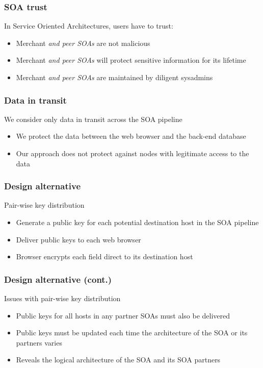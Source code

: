 \documentclass{beamer}
\begin{document}
\begin{frame}
\frametitle{SOA trust}
In Service Oriented Architectures, users have to trust:
\smallskip
\begin{itemize}
\item Merchant \emph{and peer SOAs} are not malicious
\item Merchant \emph{and peer SOAs} will protect sensitive information for its
lifetime
\item Merchant \emph{and peer SOAs} are maintained by diligent sysadmins
\end{itemize}
\end{frame}

\begin{frame}
\frametitle{Data in transit}
We consider only data in transit across the SOA pipeline
\smallskip
\begin{itemize}
\item We protect the data between the web browser and the back-end database
\item Our approach does not protect against nodes with legitimate access to the
data
\end{itemize}
\end{frame}


\begin{frame}
\frametitle{Design alternative}
Pair-wise key distribution
\smallskip
\begin{itemize}
\item Generate a public key for each potential destination host in the SOA
pipeline
\item Deliver public keys to each web browser
\item Browser encrypts each field direct to its destination host 
\end{itemize}
\end{frame}

\begin{frame}
\frametitle{Design alternative (cont.)}
Issues with pair-wise key distribution
\smallskip
\begin{itemize}
\item Public keys for all hosts in any partner SOAs must also be delivered
\item Public keys must be updated each time the architecture of the SOA or
its partners varies
\item Reveals the logical architecture of the SOA and its SOA partners
\end{itemize}
\end{frame}
\end{document}
